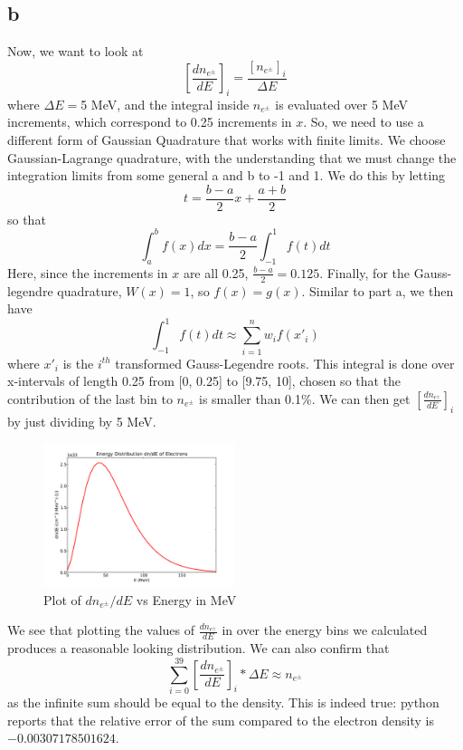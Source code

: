 \documentclass[11pt,letterpaper]{article}
\begin{document}
\subsection*{b}
Now, we want to look at $$ \left[\frac{dn_{e^{\pm}}}{dE} \right]_i = \frac{[n_{e^{\pm}}]_i}{\Delta E} $$
where $\Delta E = $5 MeV, and the integral inside $n_{e^{\pm}}$ is evaluated
over 5 MeV increments, which correspond to 0.25 increments in $x$. So, we need
to use a different form of Gaussian Quadrature that works with finite limits.
We choose Gaussian-Lagrange quadrature, with the understanding that we must 
change the integration limits from some general a and b to -1 and 1. We do this by letting $$ t = \frac{b-a}{2}x + \frac{a+b}{2} $$ so that $$ \int_{a}^{b} f(x) dx = \frac{b-a}{2} \int_{-1}^{1} f(t) dt $$
Here, since the increments in $x$ are all 0.25, $\frac{b-a}{2} = 0.125$. 
Finally, for the Gauss-legendre quadrature, $W(x) = 1$, so $f(x) = g(x)$.
Similar to part a, we then have 
$$ \int_{-1}^{1} f(t) dt \approx \sum\limits_{i=1}^{n} w_i f(x'_i)$$ 
where $x'_i$ is the $i^{th}$ transformed Gauss-Legendre roots.
This integral is done over x-intervals of length 0.25 from [0, 0.25] to [9.75, 10], chosen so that the contribution of the last bin to $n_{e^{\pm}}$ is smaller than 0.1\%. We can then get
$\left[\frac{dn_{e^{\pm}}}{dE} \right]_i $ by just dividing by 5 MeV. 

\begin{figure}[bth]
\centering
\includegraphics[width=0.5\textwidth]{gauss-legendre.pdf}
\caption{Plot of $dn_{e^{\pm}}/dE$ vs Energy in MeV}
\label{fig:legendre}
\end{figure}

We see that plotting the values of $\frac{dn_{e^{\pm}}}{dE}$ in over the 
energy bins we calculated produces a reasonable looking distribution. 
We can also confirm that 
$$ \sum\limits_{i=0}^{39} \left[ \frac{dn_{e^{\pm}}}{dE} \right]_i * \Delta E \approx n_{e^{\pm}} $$ as the infinite sum should be equal to the density. This is indeed true: python reports that the relative error of the sum 
compared to the electron density is $-0.00307178501624$.
\end{document}

